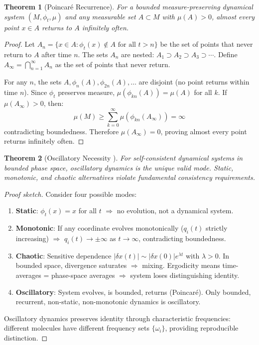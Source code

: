 \documentclass[11pt,a4paper]{article}
\newtheorem{theorem}{Theorem}[section]
\theoremstyle{definition}
\theoremstyle{remark}
\begin{document}
\begin{theorem}[Poincaré Recurrence]
\label{thm:poincare}
For a bounded measure-preserving dynamical system $(M, \phi_t, \mu)$ and any measurable set $A \subset M$ with $\mu(A) > 0$, almost every point $x \in A$ returns to $A$ infinitely often.
\end{theorem}

\begin{proof}
Let $A_n = \{x \in A : \phi_t(x) \notin A \text{ for all } t > n\}$ be the set of points that never return to $A$ after time $n$. The sets $A_n$ are nested: $A_1 \supset A_2 \supset A_3 \supset \cdots$. Define $A_\infty = \bigcap_{n=1}^\infty A_n$ as the set of points that never return.

For any $n$, the sets $A, \phi_n(A), \phi_{2n}(A), \ldots$ are disjoint (no point returns within time $n$). Since $\phi_t$ preserves measure, $\mu(\phi_{kn}(A)) = \mu(A)$ for all $k$. If $\mu(A_\infty) > 0$, then:
\begin{equation}
\mu(M) \geq \sum_{k=0}^\infty \mu(\phi_{kn}(A_\infty)) = \infty
\end{equation}
contradicting boundedness. Therefore $\mu(A_\infty) = 0$, proving almost every point returns infinitely often.
\end{proof}

\begin{theorem}[Oscillatory Necessity \cite{sachikonye2025bounded}]
\label{thm:oscillatory_necessity}
For self-consistent dynamical systems in bounded phase space, oscillatory dynamics is the unique valid mode. Static, monotonic, and chaotic alternatives violate fundamental consistency requirements.
\end{theorem}

\begin{proof}[Proof sketch]
Consider four possible modes:
\begin{enumerate}
\item \textbf{Static}: $\phi_t(x) = x$ for all $t$ $\Rightarrow$ no evolution, not a dynamical system.
\item \textbf{Monotonic}: If any coordinate evolves monotonically ($q_i(t)$ strictly increasing) $\Rightarrow$ $q_i(t) \to \pm\infty$ as $t \to \infty$, contradicting boundedness.
\item \textbf{Chaotic}: Sensitive dependence $|\delta x(t)| \sim |\delta x(0)|e^{\lambda t}$ with $\lambda > 0$. In bounded space, divergence saturates $\Rightarrow$ mixing. Ergodicity means time-averages = phase-space averages $\Rightarrow$ system loses distinguishing identity.
\item \textbf{Oscillatory}: System evolves, is bounded, returns (Poincaré). Only bounded, recurrent, non-static, non-monotonic dynamics is oscillatory.
\end{enumerate}
Oscillatory dynamics preserves identity through characteristic frequencies: different molecules have different frequency sets $\{\omega_i\}$, providing reproducible distinction.
\end{proof}
\end{document}
